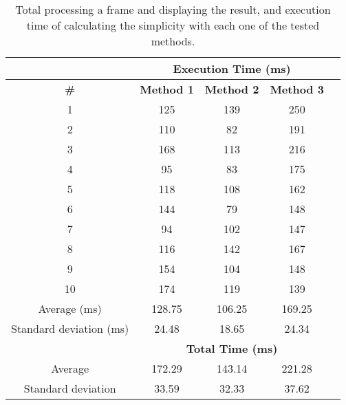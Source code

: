 \begin{table}[h]
	\footnotesize
    \begin{center}
    \begin{tabular}{c c c c c}
    \hline     
    & \multicolumn{3}{c}{\textbf{Execution Time (ms)}}\\
    \hline
    \textbf{\#} & \textbf{Method 1 \cite{luo2008photo}} & \textbf{Method 2 \cite{kaoautomatic}} & \textbf{Method 3 \cite{ke2006design}}\\
	\hline
1&	125&	139&	250\\
2&	110&	82&	191\\
3&	168&	113&	216\\
4&	95&	83&	175\\
5&	118&	108&	162\\
6&	144&	79&	148\\
7&	94&	102&	147\\
8&	116&	142&	167\\
9&	154&	104&	148\\
10&	174&	119&	139\\
	\hline
	Average (ms) &	128.75 & 106.25 & 169.25\\
	Standard deviation (ms) & 24.48 & 18.65 & 24.34\\
	\hline
	& \multicolumn{3}{c}{\textbf{Total Time (ms)}}\\
	\hline
	Average&	172.29&	143.14&	221.28 \\
	Standard deviation&	33.59&	32.33&	37.62\\
    \end{tabular}
	\end{center}
    \caption{Total processing a frame and displaying the result, and execution time of calculating the simplicity with each one of the tested methods.}
    \label{tab:simplicity}
\end{table}

